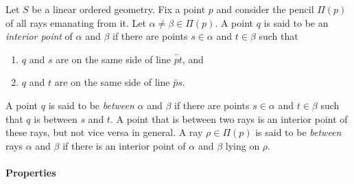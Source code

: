 \documentclass[12pt]{article}
\renewcommand{\line}[1]{\overleftrightarrow{#1}}
\begin{document}
Let $S$ be a linear ordered geometry.
Fix a point $p$ and consider the pencil $\Pi(p)$ of all rays
emanating from it.  Let $\alpha\neq\beta \in\Pi(p)$.  A point $q$ is
said to be an \emph{interior point} of $\alpha$ and $\beta$ if there
are points $s\in\alpha$ and $t\in\beta$ such that
\begin{enumerate}
\item $q$ and $s$ are on the same side of line $\line{pt}$, and
\item $q$ and $t$ are on the same side of line $\line{ps}$.
\end{enumerate}
A point $q$ is said to be \emph{between} $\alpha$ and $\beta$ if
there are points $s\in\alpha$ and $t\in\beta$ such that $q$ is
between $s$ and $t$.  A point that is between two rays is an
interior point of these rays, but not vice versa in general.  A ray
$\rho\in\Pi(p)$ is said to be \emph{between} rays $\alpha$ and
$\beta$ if there is an interior point of $\alpha$ and $\beta$ lying
on $\rho$.
\\\\
\textbf{Properties}
\end{document}
